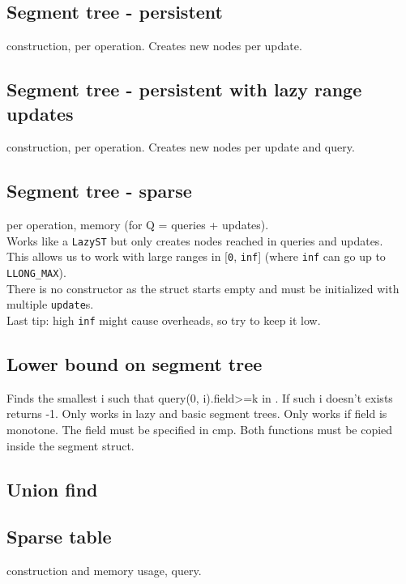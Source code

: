 \subsection{Segment tree - persistent}
 construction,  per operation.
Creates  new nodes per update.

\subsection{Segment tree - persistent with lazy range updates}
 construction,  per operation.
Creates  new nodes per update and query.

\subsection{Segment tree - sparse}
 per operation,  memory (for Q = queries + updates).\\
Works like a \verb|LazyST| but only creates nodes reached in queries and updates.\\
This allows us to work with large ranges in [\verb|0|, \verb|inf|] (where \verb|inf| can go up to \verb|LLONG_MAX|).\\
There is no constructor as the struct starts empty and must be initialized with multiple \verb|update|s.\\
Last tip: high \verb|inf| might cause overheads, so try to keep it low.

\subsection{Lower bound on segment tree}
Finds the smallest i such that query(0, i).field>=k in .
If such i doesn't exists returns -1.
Only works in lazy and basic segment trees.
Only works if field is monotone. The field must be specified in cmp.
Both functions must be copied inside the segment struct.


\subsection{Union find}

\subsection{Sparse table}
 construction and memory usage,  query.

